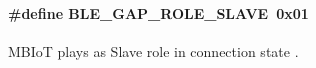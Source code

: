 \paragraph[{\texorpdfstring{B\+L\+E\+\_\+\+G\+A\+P\+\_\+\+R\+O\+L\+E\+\_\+\+S\+L\+A\+VE}{BLE_GAP_ROLE_SLAVE}}]{\setlength{\rightskip}{0pt plus 5cm}\#define B\+L\+E\+\_\+\+G\+A\+P\+\_\+\+R\+O\+L\+E\+\_\+\+S\+L\+A\+VE~0x01}\hypertarget{group___b_l_e___g_a_p___r_o_l_e_ga54958630e8e6036a451b4fb6dcf9abff}{}\label{group___b_l_e___g_a_p___r_o_l_e_ga54958630e8e6036a451b4fb6dcf9abff}
M\+B\+IoT plays as Slave role in connection state . 